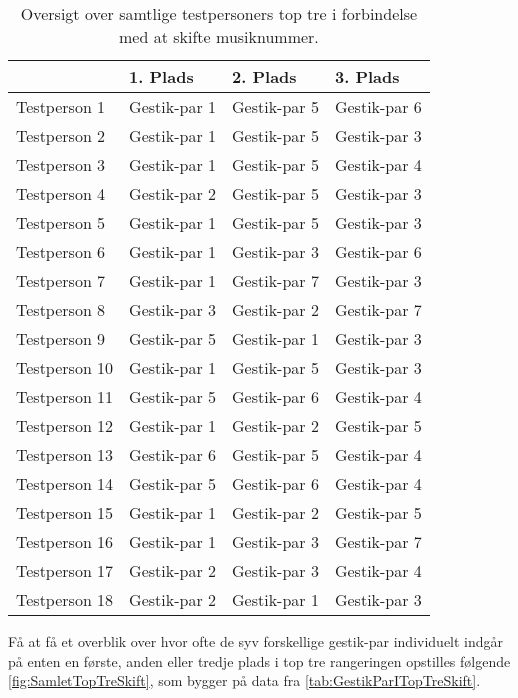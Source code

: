 \begin{table}[H]
	\centering
	\begin{tabular}{ | p{3cm} | p{3cm} | p{3cm} | p{3cm} |}
		\hline
		& 1. Plads & 2. Plads & 3. Plads \\ \hline
		Testperson 1 & Gestik-par 1 & Gestik-par 5 & Gestik-par 6 \\ \hline
		Testperson 2 & Gestik-par 1 & Gestik-par 5 & Gestik-par 3 \\ \hline
		Testperson 3 & Gestik-par 1 & Gestik-par 5 & Gestik-par 4 \\ \hline
		Testperson 4 & Gestik-par 2 & Gestik-par 5 & Gestik-par 3 \\ \hline
		Testperson 5 & Gestik-par 1 & Gestik-par 5 & Gestik-par 3 \\ \hline
		Testperson 6 & Gestik-par 1 & Gestik-par 3 & Gestik-par 6 \\ \hline 
		Testperson 7 & Gestik-par 1 & Gestik-par 7 & Gestik-par 3 \\ \hline
		Testperson 8 & Gestik-par 3 & Gestik-par 2 & Gestik-par 7 \\ \hline
		Testperson 9 & Gestik-par 5 & Gestik-par 1 & Gestik-par 3 \\ \hline
		Testperson 10 & Gestik-par 1 & Gestik-par 5 & Gestik-par 3 \\ \hline
		Testperson 11 & Gestik-par 5 & Gestik-par 6 & Gestik-par 4 \\ \hline
		Testperson 12 & Gestik-par 1 & Gestik-par 2 & Gestik-par 5 \\ \hline
		Testperson 13 & Gestik-par 6 & Gestik-par 5 & Gestik-par 4 \\ \hline
		Testperson 14 & Gestik-par 5 & Gestik-par 6 & Gestik-par 4 \\ \hline
		Testperson 15 & Gestik-par 1 & Gestik-par 2 & Gestik-par 5 \\ \hline
		Testperson 16 & Gestik-par 1 & Gestik-par 3 & Gestik-par 7 \\ \hline
		Testperson 17 & Gestik-par 2 & Gestik-par 3 & Gestik-par 4 \\ \hline
		Testperson 18 & Gestik-par 2 & Gestik-par 1 & Gestik-par 3 \\ \hline
	\end{tabular}
	\caption{Oversigt over samtlige testpersoners top tre i forbindelse med at skifte musiknummer.}
	\label{tab:GestikParITopTreSkift}
\end{table}
\noindent
Få at få et overblik over hvor ofte de syv forskellige gestik-par individuelt indgår på enten en første, anden eller tredje plads i top tre rangeringen opstilles følgende \autoref{fig:SamletTopTreSkift}, som bygger på data fra \autoref{tab:GestikParITopTreSkift}. 
